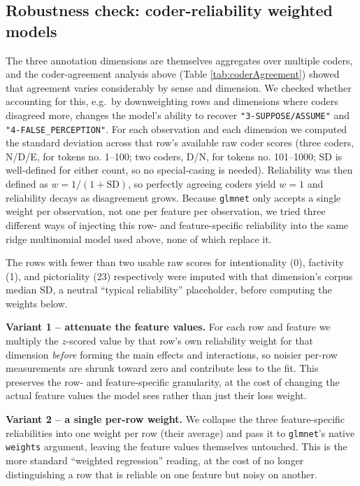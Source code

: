 \documentclass[
]{article}
\begin{document}
\subsection{Robustness check: coder-reliability weighted
models}\label{robustness-check-coder-reliability-weighted-models}

The three annotation dimensions are themselves aggregates over multiple
coders, and the coder-agreement analysis above (Table
\ref{tab:coderAgreement}) showed that agreement varies considerably by
sense and dimension. We checked whether accounting for this, e.g.~by
downweighting rows and dimensions where coders disagreed more, changes
the model's ability to recover \texttt{"3-SUPPOSE/ASSUME"} and
\texttt{"4-FALSE\_PERCEPTION"}. For each observation and each dimension
we computed the standard deviation across that row's available raw coder
scores (three coders, N/D/E, for tokens no. 1--100; two coders, D/N, for
tokens no. 101--1000; SD is well-defined for either count, so no
special-casing is needed). Reliability was then defined as
\(w = 1 / (1 + \text{SD})\), so perfectly agreeing coders yield \(w=1\)
and reliability decays as disagreement grows. Because \texttt{glmnet}
only accepts a single weight per observation, not one per feature per
observation, we tried three different ways of injecting this row- and
feature-specific reliability into the same ridge multinomial model used
above, none of which replace it.

The rows with fewer than two usable raw scores for intentionality (0),
factivity (1), and pictoriality (23) respectively were imputed with that
dimension's corpus median SD, a neutral ``typical reliability''
placeholder, before computing the weights below.

\textbf{Variant 1 -- attenuate the feature values.} For each row and
feature we multiply the \(z\)-scored value by that row's own reliability
weight for that dimension \emph{before} forming the main effects and
interactions, so noisier per-row measurements are shrunk toward zero and
contribute less to the fit. This preserves the row- and feature-specific
granularity, at the cost of changing the actual feature values the model
sees rather than just their loss weight.

\textbf{Variant 2 -- a single per-row weight.} We collapse the three
feature-specific reliabilities into one weight per row (their average)
and pass it to \texttt{glmnet}'s native \texttt{weights} argument,
leaving the feature values themselves untouched. This is the more
standard ``weighted regression'' reading, at the cost of no longer
distinguishing a row that is reliable on one feature but noisy on
another.
\end{document}
